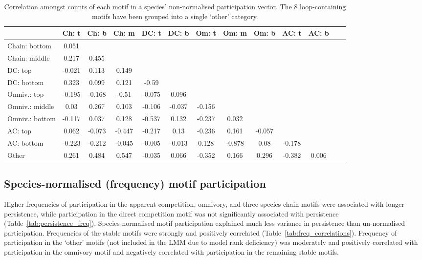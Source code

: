 \documentclass[12pt]{article}
\begin{document}
\begin{spacing}{2.0}
		\begin{table}[hb!]
    		\caption{Correlation amongst counts of each motif in a species' non-normalised participation vector. The 8 loop-containing motifs have been grouped into a single `other' category.}
    		\label{tab:position_count_correlations}
    		\footnotesize
    		\begin{tabular}{l | c c c c c c c c c c c c}    
        		&	Ch: t	&	Ch: b	&	Ch: m	&	DC: t	&	DC: b	&	Om: t	&	Om: m	&	Om: b	&	AC: t	&	AC: b	\\
                \hline
                Chain: bottom	&	0.051	&		&		&		&		&		&		&		&		&		\\
                Chain: middle	&	0.217	&	0.455	&		&		&		&		&		&		&		&		\\
                DC: top	&	-0.021	&	0.113	&	0.149	&		&		&		&		&		&		&		\\
                DC: bottom	&	0.323	&	0.099	&	0.121	&	-0.59	&		&		&		&		&		&		\\
                Omniv.: top	&	-0.195	&	-0.168	&	-0.51	&	-0.075	&	0.096	&		&		&		&		&		\\
                Omniv.: middle	&	0.03	&	0.267	&	0.103	&	-0.106	&	-0.037	&	-0.156	&		&		&		&		\\
                Omniv.: bottom	&	-0.117	&	0.037	&	0.128	&	-0.537	&	0.132	&	-0.237	&	0.032	&		&		&		\\
                AC: top	&	0.062	&	-0.073	&	-0.447	&	-0.217	&	0.13	&	-0.236	&	0.161	&	-0.057	&		&		\\
                AC: bottom	&	-0.223	&	-0.212	&	-0.045	&	-0.005	&	-0.013	&	0.128	&	-0.878	&	0.08	&	-0.178	&		\\
                Other	&	0.261	&	0.484	&	0.547	&	-0.035	&	0.066	&	-0.352	&	0.166	&	0.296	&	-0.382	&	0.006	\\
                \hline
            \end{tabular}
            \end{table}
            

	\subsection*{Species-normalised (frequency) motif participation}

		Higher frequencies of participation in the apparent competition, omnivory, and three-species chain motifs were associated with longer persistence, while participation in the direct competition motif was not significantly associated with persistence (Table~\ref{tab:persistence_freq}).
		Species-normalised motif participation explained much less variance in persistence than un-normalised participation.
		Frequencies of the stable motifs were strongly and positively correlated (Table~\ref{tab:freq_correlations}).
		Frequency of participation in the `other' motifs (not included in the LMM due to model rank deficiency) was moderately and positively correlated with participation in the omnivory motif and negatively correlated with participation in the remaining stable motifs.



\end{spacing}
\end{document}
